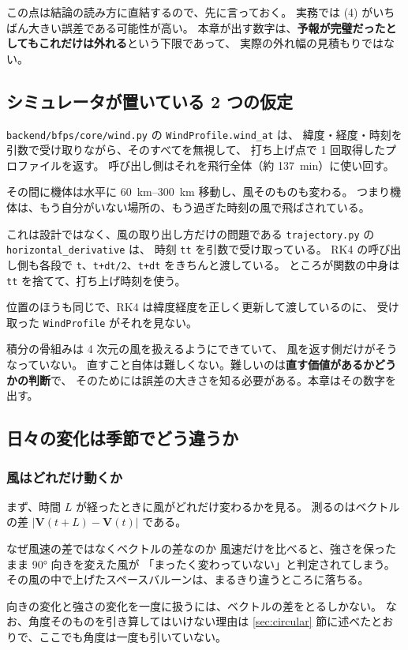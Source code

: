 この点は結論の読み方に直結するので、先に言っておく。
実務では (4) がいちばん大きい誤差である可能性が高い。
本章が出す数字は、\textbf{予報が完璧だったとしてもこれだけは外れる}という下限であって、
実際の外れ幅の見積もりではない。

\subsection{シミュレータが置いている 2 つの仮定}

\texttt{backend/bfps/core/wind.py} の \texttt{WindProfile.wind\_at} は、
緯度・経度・時刻を引数で受け取りながら、そのすべてを無視して、
打ち上げ点で 1 回取得したプロファイルを返す。
呼び出し側はそれを飛行全体（約 \SI{137}{\minute}）に使い回す。

その間に機体は水平に \SIrange{60}{300}{\kilo\metre} 移動し、風そのものも変わる。
つまり機体は、もう自分がいない場所の、もう過ぎた時刻の風で飛ばされている。

\begin{whybox}{これは設計ではなく、風の取り出し方だけの問題である}
\texttt{trajectory.py} の \texttt{horizontal\_derivative} は、
時刻 \texttt{tt} を引数で受け取っている。
RK4 の呼び出し側も各段で \texttt{t}、\texttt{t+dt/2}、\texttt{t+dt} をきちんと渡している。
ところが関数の中身は \texttt{tt} を捨てて、打ち上げ時刻を使う。

位置のほうも同じで、RK4 は緯度経度を正しく更新して渡しているのに、
受け取った \texttt{WindProfile} がそれを見ない。

積分の骨組みは 4 次元の風を扱えるようにできていて、
風を返す側だけがそうなっていない。
直すこと自体は難しくない。難しいのは\textbf{直す価値があるかどうかの判断}で、
そのためには誤差の大きさを知る必要がある。本章はその数字を出す。
\end{whybox}

\subsection{日々の変化は季節でどう違うか}
\label{sec:fidelity-variability}

\subsubsection{風はどれだけ動くか}

まず、時間 $L$ が経ったときに風がどれだけ変わるかを見る。
測るのはベクトルの差 $|\mathbf{V}(t+L) - \mathbf{V}(t)|$ である。

\begin{whybox}{なぜ風速の差ではなくベクトルの差なのか}
風速だけを比べると、強さを保ったまま \ang{90} 向きを変えた風が
「まったく変わっていない」と判定されてしまう。
その風の中で上げたスペースバルーンは、まるきり違うところに落ちる。

向きの変化と強さの変化を一度に扱うには、ベクトルの差をとるしかない。
なお、角度そのものを引き算してはいけない理由は
\ref{sec:circular} 節に述べたとおりで、ここでも角度は一度も引いていない。
\end{whybox}

